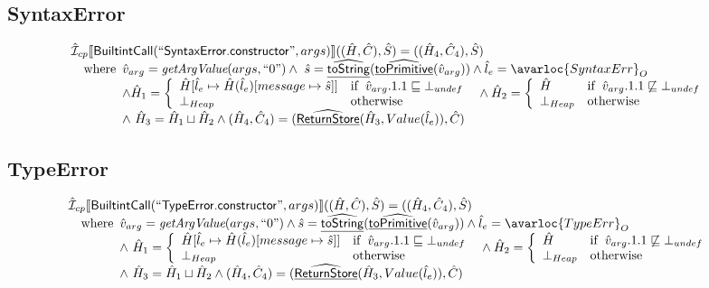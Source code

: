 \subsection{SyntaxError}
\[
\begin{array}{l}
\aI _{cp}\lbr \SF{BuiltintCall}(``\SF{SyntaxError.constructor}",args)\rbr((\hat{H},\hat{C}), \hat{S})
  = ((\hat{H}_4, \hat{C}_4), \hat{S})\\
\quad\wherec{
  \hat{v}_{arg} = \hf{getArgValue}(args, ``0")
  \land\ \hat{s}= \ahf{toString}(\ahf{toPrimitive}(\hat{v}_{arg}))
  \land \hat{l}_e = \avarloc{SyntaxErr}_O\\
  \land \hat{H}_1 = \left\{\begin{array}{ll}
      \hat{H}[\hat{l}_e \mapsto \hat{H}(\hat{l}_e)[message \mapsto \hat{s}]]
      & \ifc{\hat{v}_{arg}.1.1 \sqsubseteq \bot_{undef}}\\
      \bot_{Heap} & \owc
    \end{array}\right.
  \land \hat{H}_2 = \left\{\begin{array}{ll}
      \hat{H}
      & \ifc{\hat{v}_{arg}.1.1 \not\sqsubseteq \bot_{undef}}\\
      \bot_{Heap} & \owc
    \end{array}\right.\\
  \land\ \hat{H}_3 = \hat{H}_1 \sqcup \hat{H}_2
  \land (\hat{H}_4, \hat{C}_4) = (\ahf{ReturnStore}(\hat{H}_3, Value(\hat{l}_e)), \hat{C})\\
  }\\

\end{array}
\]


\subsection{TypeError}
\[
\begin{array}{l}
\aI _{cp}\lbr \SF{BuiltintCall}(``\SF{TypeError.constructor}",args)\rbr((\hat{H},\hat{C}), \hat{S})
  = ((\hat{H}_4, \hat{C}_4), \hat{S})\\
\quad\wherec{
  \hat{v}_{arg} = \hf{getArgValue}(args, ``0")
  \land \hat{s}= \ahf{toString}(\ahf{toPrimitive}(\hat{v}_{arg}))
  \land \hat{l}_e = \avarloc{TypeErr}_O\\
  \land\ \hat{H}_1 = \left\{\begin{array}{ll}
      \hat{H}[\hat{l}_e \mapsto \hat{H}(\hat{l}_e)[message \mapsto \hat{s}]]
      & \ifc{\hat{v}_{arg}.1.1 \sqsubseteq \bot_{undef}}\\
      \bot_{Heap} & \owc
    \end{array}\right.
  \land \hat{H}_2 = \left\{\begin{array}{ll}
      \hat{H}
      & \ifc{\hat{v}_{arg}.1.1 \not\sqsubseteq \bot_{undef}}\\
      \bot_{Heap} & \owc
    \end{array}\right.\\
  \land\ \hat{H}_3 = \hat{H}_1 \sqcup \hat{H}_2
  \land (\hat{H}_4, \hat{C}_4) = (\ahf{ReturnStore}(\hat{H}_3, Value(\hat{l}_e)), \hat{C})\\
  }\\

\end{array}
\]


